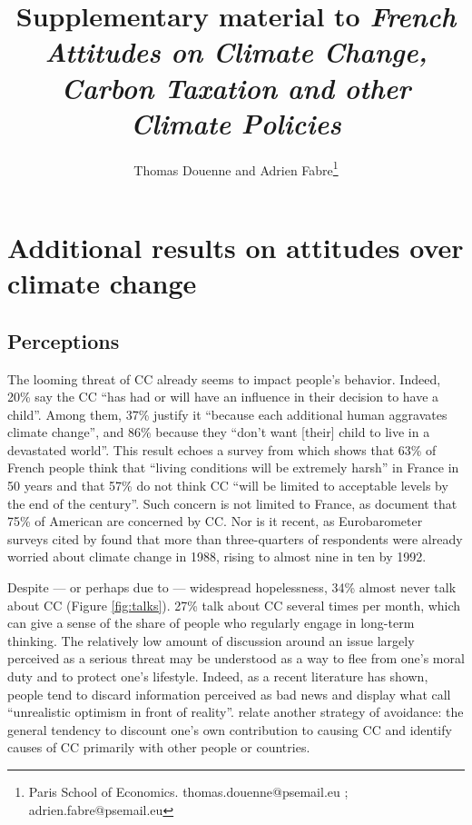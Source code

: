 \documentclass[11pt]{article}
\date{}
\title{Supplementary material to \textit{French Attitudes on Climate Change, Carbon Taxation and other Climate Policies}}
\author{Thomas Douenne and Adrien Fabre\footnote{Paris School of Economics.  thomas.douenne@psemail.eu ; adrien.fabre@psemail.eu}}
\begin{document}
\maketitle


  



\setcounter{tocdepth}{1}
\tableofcontents




\section{Additional results on attitudes over climate change}
    

      \subsection{Perceptions\label{subsec:opinions}
      }

The looming threat of CC already seems to impact people's behavior. Indeed, 20\% say the CC ``has had or will have an influence in their decision to have a child''. Among them, 37\% justify it ``because each additional human aggravates climate change'', and 86\% because they ``don't want [their] child to live in a devastated world''. This result echoes a survey from \citet{ademe_representations_2018} which shows that 63\% of French people think that ``living conditions will be extremely harsh'' in France in 50 years and that 57\% do not think CC ``will be limited to acceptable levels by the end of the century''. Such concern is not limited to France, as \citet{funk_politics_2016} document that 75\% of American are concerned by CC. Nor is it recent, as Eurobarometer surveys cited by \citet{whitmarsh_2_2018} found that more than three-quarters of respondents were already worried about climate change in 1988, rising to almost nine in ten by 1992.

Despite --- or perhaps due to --- widespread hopelessness, 34\% almost never talk about CC (Figure \ref{fig:talks}). 27\% talk about CC several times per month, which can give a sense of the share of people who regularly engage in long-term thinking. The relatively low amount of discussion around an issue largely perceived as a serious threat may be understood as a way to flee from one's moral duty and to protect one's lifestyle. Indeed, as a recent literature has shown, people tend to discard information perceived as bad news and display what \citet{sharot_et_al_2011} call ``unrealistic optimism in front of reality''. \citet{whitmarsh_2_2018} relate another strategy of avoidance: the general tendency to discount one’s own contribution to causing CC and identify causes of CC primarily with other people or countries. %
\end{document}
